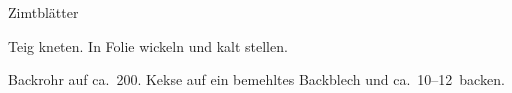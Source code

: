\begin{recipe}{Zimtblätter}

    \begin{ingredients}
    \end{ingredients}

    \begin{instructions}
        Teig kneten.
        In Folie wickeln und kalt stellen.

        Backrohr auf ca.\ 200\degC.
        Kekse auf ein bemehltes Backblech und ca.\ 10--12\minutes\ backen.
    \end{instructions}
\end{recipe}
